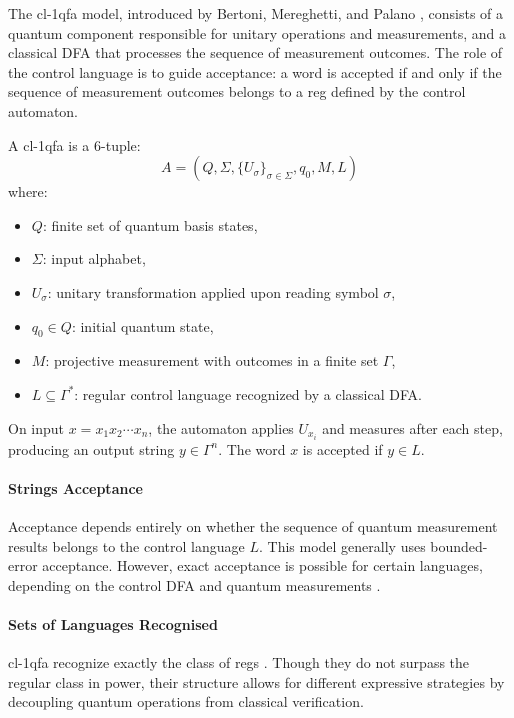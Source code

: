   
The \gls{cl-1qfa} model, introduced by Bertoni, Mereghetti, and Palano \cite{mereghetti2006quantum}, consists of a quantum component responsible for unitary operations and measurements, and a classical DFA that processes the sequence of measurement outcomes. The role of the control language is to guide acceptance: a word is accepted if and only if the sequence of measurement outcomes belongs to a \gls{reg} defined by the control automaton.

\begin{definition}
A \gls{cl-1qfa} is a 6-tuple:
\[
A = (Q, \Sigma, \{U_\sigma\}_{\sigma \in \Sigma}, q_0, M, L)
\]
where:
\begin{itemize}
    \item $Q$: finite set of quantum basis states,
    \item $\Sigma$: input alphabet,
    \item $U_\sigma$: unitary transformation applied upon reading symbol $\sigma$,
    \item $q_0 \in Q$: initial quantum state,
    \item $M$: projective measurement with outcomes in a finite set $\Gamma$,
    \item $L \subseteq \Gamma^*$: regular control language recognized by a classical DFA.
\end{itemize}
\end{definition}
On input $x = x_1x_2\cdots x_n$, the automaton applies $U_{x_i}$ and measures after each step, producing an output string $y \in \Gamma^n$. The word $x$ is accepted if $y \in L$.

\paragraph{Strings Acceptance}  
Acceptance depends entirely on whether the sequence of quantum measurement results belongs to the control language $L$. This model generally uses bounded-error acceptance. However, exact acceptance is possible for certain languages, depending on the control DFA and quantum measurements \cite{mereghetti2006quantum}.

\paragraph{Sets of Languages Recognised}  
\gls{cl-1qfa} recognize exactly the class of \glspl{reg} \cite{li2015hybrid}. Though they do not surpass the regular class in power, their structure allows for different expressive strategies by decoupling quantum operations from classical verification.

